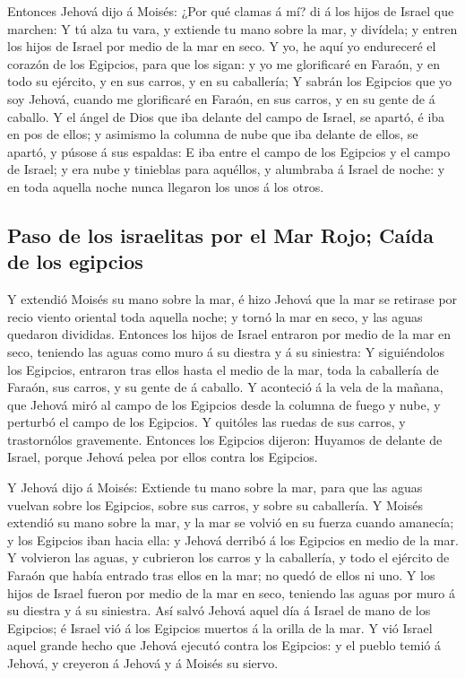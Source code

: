  Entonces Jehová dijo á Moisés: ¿Por qué clamas á mí? di
á los hijos de Israel que marchen:  Y tú alza tu vara, y
extiende tu mano sobre la mar, y divídela; y entren los hijos de Israel
por medio de la mar en seco.  Y yo, he aquí yo endureceré
el corazón de los Egipcios, para que los sigan: y yo me glorificaré en
Faraón, y en todo su ejército, y en sus carros, y en su caballería;
 Y sabrán los Egipcios que yo soy Jehová, cuando me
glorificaré en Faraón, en sus carros, y en su gente de á caballo.
 Y el ángel de Dios que iba delante del campo de Israel,
se apartó, é iba en pos de ellos; y asimismo la columna de nube que iba
delante de ellos, se apartó, y púsose á sus espaldas:  E
iba entre el campo de los Egipcios y el campo de Israel; y era nube y
tinieblas para aquéllos, y alumbraba á Israel de noche: y en toda
aquella noche nunca llegaron los unos á los otros.

\hypertarget{paso-de-los-israelitas-por-el-mar-rojo-cauxedda-de-los-egipcios}{%
\subsection{Paso de los israelitas por el Mar Rojo; Caída de los
egipcios}\label{paso-de-los-israelitas-por-el-mar-rojo-cauxedda-de-los-egipcios}}

 Y extendió Moisés su mano sobre la mar, é hizo Jehová
que la mar se retirase por recio viento oriental toda aquella noche; y
tornó la mar en seco, y las aguas quedaron divididas. 
Entonces los hijos de Israel entraron por medio de la mar en seco,
teniendo las aguas como muro á su diestra y á su siniestra:
 Y siguiéndolos los Egipcios, entraron tras ellos hasta
el medio de la mar, toda la caballería de Faraón, sus carros, y su gente
de á caballo.  Y aconteció á la vela de la mañana, que
Jehová miró al campo de los Egipcios desde la columna de fuego y nube, y
perturbó el campo de los Egipcios.  Y quitóles las ruedas
de sus carros, y trastornólos gravemente. Entonces los Egipcios dijeron:
Huyamos de delante de Israel, porque Jehová pelea por ellos contra los
Egipcios.

 Y Jehová dijo á Moisés: Extiende tu mano sobre la mar,
para que las aguas vuelvan sobre los Egipcios, sobre sus carros, y sobre
su caballería.  Y Moisés extendió su mano sobre la mar, y
la mar se volvió en su fuerza cuando amanecía; y los Egipcios iban hacia
ella: y Jehová derribó á los Egipcios en medio de la mar.
 Y volvieron las aguas, y cubrieron los carros y la
caballería, y todo el ejército de Faraón que había entrado tras ellos en
la mar; no quedó de ellos ni uno.  Y los hijos de Israel
fueron por medio de la mar en seco, teniendo las aguas por muro á su
diestra y á su siniestra.  Así salvó Jehová aquel día á
Israel de mano de los Egipcios; é Israel vió á los Egipcios muertos á la
orilla de la mar.  Y vió Israel aquel grande hecho que
Jehová ejecutó contra los Egipcios: y el pueblo temió á Jehová, y
creyeron á Jehová y á Moisés su siervo.


